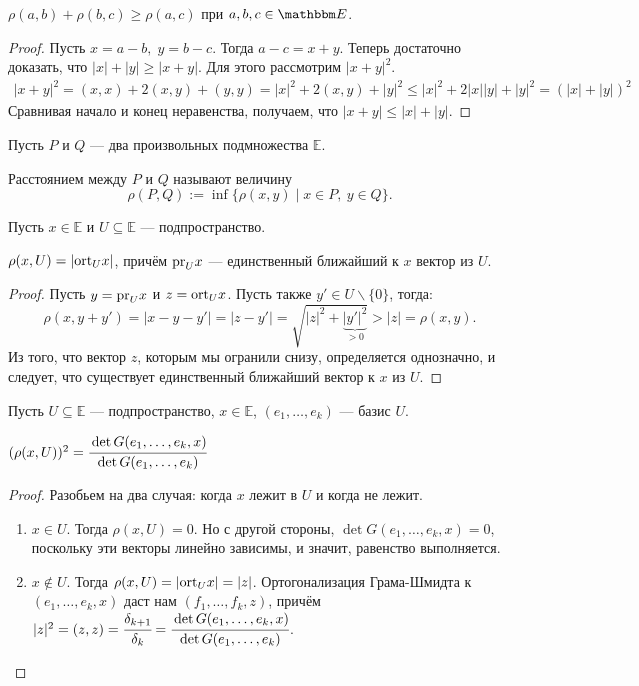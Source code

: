 \begin{Suggestion}
	$\rho(a,b) + \rho(b,c) \geqslant \rho(a,c)$ при $a, b, c \in \E$.
\end{Suggestion}

\begin{proof}
	Пусть $x = a-b,\; y = b - c$. Тогда $a-c = x +y$. Теперь достаточно доказать, что $|x| + |y| \geqslant |x + y|$. Для этого рассмотрим $|x + y|^2$.
	\begin{gather*}
	|x+y|^2 = (x, x) + 2(x, y) + (y, y) = |x|^2 + 2(x, y) + |y|^2 \leqslant |x|^2 + 2|x||y|+ |y|^2 = (|x| + |y|)^2
	\end{gather*}
	Сравнивая начало и конец неравенства, получаем, что $|x+y| \leqslant |x| + |y|$.
\end{proof}
Пусть $P$ и $Q$ --- два произвольных подмножества $\mathbb{E}$.
\begin{Def}
	Расстоянием между $P$ и $Q$ называют величину 
	$$
	\rho (P,Q) := \inf \{\rho(x,y) \mid x\in P,\ y\in Q\}.
	$$
\end{Def}
Пусть $x \in \mathbb{E}$ и $U \subseteq \mathbb{E}$ --- подпространство.
\begin{Theorem}
	$\rho (x,U) = |\mathrm{ort}_U x|$, причём $\mathrm{pr}_U x$ --- единственный ближайший к $x$ вектор из $U$.
\end{Theorem}
\begin{proof}
	Пусть $y = \mathrm{pr}_U x$ и $z = \mathrm{ort}_U x$. Пусть также $y' \in U\backslash \{0\}$, тогда:
	\[
		\rho(x, y + y') = |x - y - y'| = |z - y'| = \sqrt{|z|^2 + \underbrace{|y'|^2}_{>0}} > |z| = \rho(x,y).
	\]
	Из того, что вектор $z$, которым мы огранили снизу, определяется однозначно, и следует, что существует единственный ближайший вектор к $x$ из $U$.
\end{proof}
Пусть $U \subseteq \mathbb{E}$ --- подпространство, $x \in \mathbb{E}$, $(e_1, \ldots, e_k)$ --- базис $U$.
\begin{Theorem}
	$(\rho(x,U))^2 = \cfrac{\det G(e_1, \ldots, e_k, x)}{\det G(e_1, \ldots, e_k)}$
\end{Theorem}
\begin{proof}
	Разобьем на два случая: когда $x$ лежит в $U$ и когда не лежит.
	\begin{enumerate}
	\item $x \in U$. Тогда $\rho (x,U) = 0$. Но с другой стороны, $\det G(e_1, \ldots, e_k, x) = 0$, поскольку эти векторы линейно зависимы, и значит, равенство выполняется.
	\item $x \notin U$. Тогда $\rho(x,U) = |\mathrm{ort}_U x| = |z|$. Ортогонализация Грама-Шмидта к $(e_1, \ldots, e_k, x)$ даст нам $(f_1, \ldots, f_k, z)$, причём $|z|^2 = (z,z) = \cfrac{\delta_{k+1}}{\delta_{k}} = \cfrac{\det G(e_1, \ldots, e_k, x)}{\det G(e_1, \ldots, e_k)}$.
	\end{enumerate}
\end{proof}

